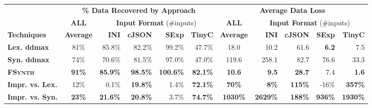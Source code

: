 \documentclass[sigconf,review,anonymous]{acmart}
\newcommand{\approach}{\textsc{FSynth}\xspace}
\newcommand{\ddmax}{\textit{DDMax}\xspace}
\begin{document}
\begin{table*}[!tbp]\centering
\caption{Data Recovery (file size difference) and Data Loss  (Levenshtein distance) of \approach vs. %
lexical (Lex.) \ddmax and syntactic (Syn.) \ddmax. 
The highest data recovery and lowest data loss are in bold, percentage improvement (Impr.) %
of \approach over the best baseline which are significant (i.e., greater than five percent (>5\%)) are also in bold.
}
\begin{tabular}{|l | c |  r  r  r  r  | c |  r  r  r  r |}
\hline
 &  \multicolumn{5}{c|}{\textbf{\% Data Recovered by Approach}} &  \multicolumn{5}{c|}{\textbf{Average Data Loss }}  \\
&  \multicolumn{1}{c|}{\textbf{ALL}} & \multicolumn{4}{c|}{\textbf{Input Format} (\#inputs)}  &  \multicolumn{1}{c|}{\textbf{ALL}} & \multicolumn{4}{c|}{\textbf{Input Format} (\#inputs)}  \\
\textbf{Techniques} & \textbf{Average} & \textbf{INI} & \textbf{cJSON} & \textbf{SExp} & \textbf{TinyC} & \textbf{Average} & \textbf{INI} & \textbf{cJSON} & \textbf{SExp} & \textbf{TinyC} \\
\hline
\textbf{Lex. ddmax} & 81\%  & 85.8\% & 82.2\%	 & 99.2\%	& 47.7\% & 18.0 & {10.2} &	61.6 &	\textbf{6.2} & 7.5 \\			
\textbf{Syn. ddmax} & 74\%  &  70.6\% & 81.5\%  & 97.0\%	& 47.0\% & 119.6 &  258.1 & 82.7 &	76.6 &	33.3 \\	
\hline
\textbf{\approach} & \textbf{91\%}  &  \textbf{85.9\%} & \textbf{98.5\%} & \textbf{100.6\%} & \textbf{82.1\%} & \textbf{10.6}  & \textbf{9.5} &	\textbf{28.7} &	7.4 & \textbf{1.6} \\
\hline
\textbf{Impr. vs. Lex.} & 12\% &  0.1\%	& \textbf{19.8\%}	& 1.4\%	& \textbf{72.1\%} & \textbf{70\%} &  \textbf{8\%} & \textbf{115\%} & -16\% & \textbf{357\%} \\
\textbf{Impr. vs. Syn.} & \textbf{23\%}  &  \textbf{21.6\%} 	& \textbf{20.8\%}	& 3.7\%	& \textbf{74.7\% }  & \textbf{1030\%} & \textbf{2629\%} &	\textbf{188\%} & \textbf{936\%} &\textbf{ 1930\%} \\
\hline
\end{tabular}
\label{tab:data-recovery-and-loss}
\end{table*}
\end{document}
